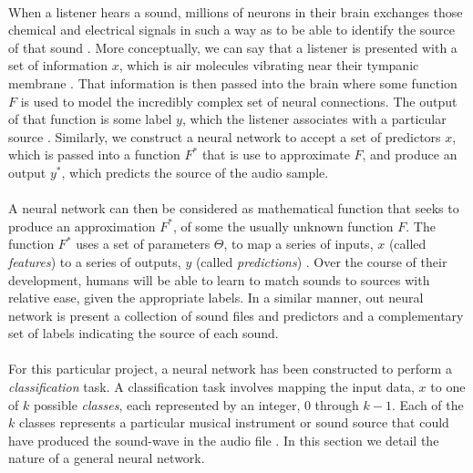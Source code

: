 \documentclass[12pt,letterpaper]{article}
\begin{document}
\paragraph*{}When a listener hears a sound, millions of neurons in their brain exchanges those chemical and electrical signals in such a way as to be able to identify the source of that sound \cite{Geron,Virtanen}. More conceptually, we can say that a listener is presented with a set of information $x$, which is air molecules vibrating near their tympanic membrane \cite{White,Olson}. That information is then passed into the brain where some function $F$ is used to model the incredibly complex set of neural connections. The output of that function is some label $y$, which the listener associates with a particular source \cite{Olson}. Similarly, we construct a neural network to accept a set of predictors $x$, which is passed into a function $F^*$ that is use to approximate $F$, and produce an output $y^*$, which predicts the source of the audio sample.

\paragraph*{}A neural network can then be considered as mathematical function that seeks to produce an approximation $F^*$, of some the usually unknown function $F$. The function $F^*$ uses a set of parameters $\Theta$, to map a series of inputs, $x$ (called \textit{features}) to a series of outputs, $y$ (called \textit{predictions}) \cite{Goodfellow,James,Virtanen}. Over the course of their development, humans will be able to learn to match sounds to sources with relative ease, given the appropriate labels. In a similar manner, out neural network is present a collection of sound files and predictors and a complementary set of labels indicating the source of each sound.

\paragraph*{}For this particular project, a neural network has been constructed to perform a \textit{classification} task. A classification task involves mapping the input data, $x$ to one of $k$ possible \textit{classes}, each represented by an integer, $0$ through $k-1$. Each of the $k$ classes represents a particular musical instrument or sound source that could have produced the sound-wave in the audio file \cite{Goodfellow,Loy,Virtanen}. In this section we detail the nature of a general neural network. 
\end{document}
